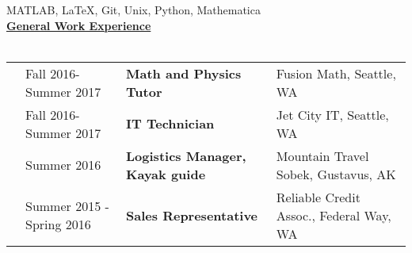 \documentclass[letterpaper,11pt,oneside]{article}
\newcommand{\headr}[1]{\vspace{10pt}\uline{\Large{\textbf{#1}} \hfill } \\ \vspace{-10pt}\\}
\begin{document}
MATLAB, \LaTeX, Git, Unix, Python, Mathematica\\

\headr{General Work Experience}

\begin{tabular}{@{} p{0.01cm} p{4.5cm} p{5cm} p{12cm}}
& Fall 2016-Summer 2017 & \textbf{Math and Physics Tutor} & Fusion Math, Seattle, WA\\
& Fall 2016-Summer 2017 & \textbf{IT Technician} & Jet City IT, Seattle, WA\\
& Summer 2016 & \textbf{Logistics Manager, \newline Kayak guide} & Mountain Travel Sobek, Gustavus, AK\\
& Summer 2015 - Spring 2016 & \textbf{Sales Representative} & Reliable Credit Assoc., Federal Way, WA\\
\end{tabular}

\end{document}
